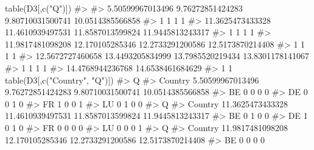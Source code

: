 \documentclass[
  letterpaper,
  DIV=11,
  numbers=noendperiod]{scrreprt}
\newenvironment{Shaded}{\begin{snugshade}}{\end{snugshade}}
\newcommand{\CommentTok}[1]{\textcolor[rgb]{0.37,0.37,0.37}{#1}}
\newcommand{\FunctionTok}[1]{\textcolor[rgb]{0.28,0.35,0.67}{#1}}
\newcommand{\NormalTok}[1]{\textcolor[rgb]{0.00,0.23,0.31}{#1}}
\newcommand{\StringTok}[1]{\textcolor[rgb]{0.13,0.47,0.30}{#1}}
\begin{document}
\begin{Shaded}
\begin{Highlighting}[]
\FunctionTok{table}\NormalTok{(D3[,}\FunctionTok{c}\NormalTok{(}\StringTok{"Q"}\NormalTok{)])}
\CommentTok{\#\textgreater{} }
\CommentTok{\#\textgreater{} 5.50599967013496 9.76272851424283 9.80710031500741 10.0514385566858 }
\CommentTok{\#\textgreater{}                1                1                1                1 }
\CommentTok{\#\textgreater{} 11.3625473433328 11.4610939497531 11.8587013599824 11.9445813243317 }
\CommentTok{\#\textgreater{}                1                1                1                1 }
\CommentTok{\#\textgreater{} 11.9817481098208  12.170105285346 12.2733291200586 12.5173870214408 }
\CommentTok{\#\textgreater{}                1                1                1                1 }
\CommentTok{\#\textgreater{} 12.5672727460658 13.4493205834999 13.7985520219434 13.8301178141067 }
\CommentTok{\#\textgreater{}                1                1                1                1 }
\CommentTok{\#\textgreater{} 14.4768944236768 14.6538461684629 }
\CommentTok{\#\textgreater{}                1                1}
\FunctionTok{table}\NormalTok{(D3[,}\FunctionTok{c}\NormalTok{(}\StringTok{"Country"}\NormalTok{, }\StringTok{"Q"}\NormalTok{)])}
\CommentTok{\#\textgreater{}        Q}
\CommentTok{\#\textgreater{} Country 5.50599967013496 9.76272851424283 9.80710031500741 10.0514385566858}
\CommentTok{\#\textgreater{}      BE                0                0                0                0}
\CommentTok{\#\textgreater{}      DE                0                0                1                0}
\CommentTok{\#\textgreater{}      FR                1                0                0                1}
\CommentTok{\#\textgreater{}      LU                0                1                0                0}
\CommentTok{\#\textgreater{}        Q}
\CommentTok{\#\textgreater{} Country 11.3625473433328 11.4610939497531 11.8587013599824 11.9445813243317}
\CommentTok{\#\textgreater{}      BE                0                1                0                0}
\CommentTok{\#\textgreater{}      DE                1                0                1                0}
\CommentTok{\#\textgreater{}      FR                0                0                0                0}
\CommentTok{\#\textgreater{}      LU                0                0                0                1}
\CommentTok{\#\textgreater{}        Q}
\CommentTok{\#\textgreater{} Country 11.9817481098208 12.170105285346 12.2733291200586 12.5173870214408}
\CommentTok{\#\textgreater{}      BE                0               0                0                0}

\end{Highlighting}
\end{Shaded}
\end{document}
